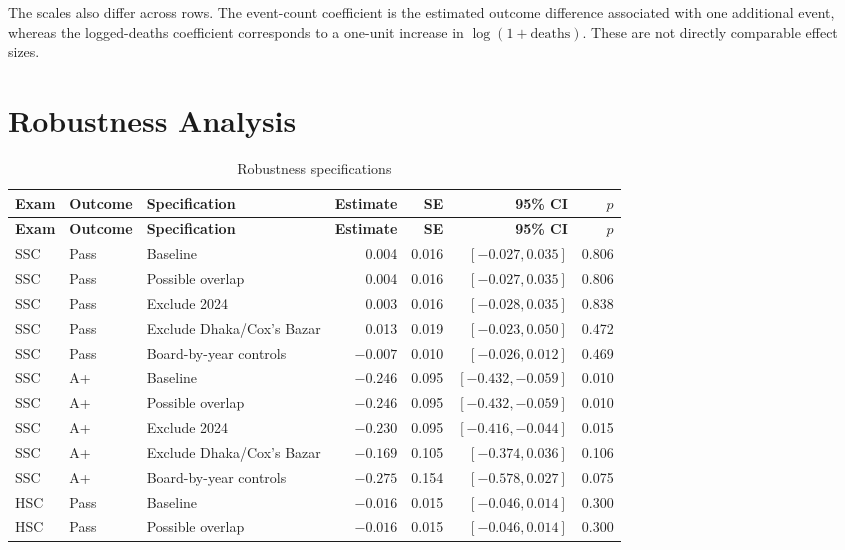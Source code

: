 \documentclass[11pt]{article}
\begin{document}
The scales also differ across rows. The event-count coefficient is the estimated outcome difference associated with one additional event, whereas the logged-deaths coefficient corresponds to a one-unit increase in $\log(1+\text{deaths})$. These are not directly comparable effect sizes.

\section{Robustness Analysis}

\begin{landscape}
{\small
\setlength{\tabcolsep}{5pt}
\begin{longtable}{lllrrrr}
\caption{Robustness specifications}\label{tab:robustness}\\
\toprule
\textbf{Exam} & \textbf{Outcome} & \textbf{Specification} & \textbf{Estimate} & \textbf{SE} & \textbf{95\% CI} & \textbf{$p$} \\
\midrule
\endfirsthead
\toprule
\textbf{Exam} & \textbf{Outcome} & \textbf{Specification} & \textbf{Estimate} & \textbf{SE} & \textbf{95\% CI} & \textbf{$p$} \\
\midrule
\endhead
SSC & Pass & Baseline & 0.004 & 0.016 & $[-0.027,0.035]$ & 0.806 \\
SSC & Pass & Possible overlap & 0.004 & 0.016 & $[-0.027,0.035]$ & 0.806 \\
SSC & Pass & Exclude 2024 & 0.003 & 0.016 & $[-0.028,0.035]$ & 0.838 \\
SSC & Pass & Exclude Dhaka/Cox's Bazar & 0.013 & 0.019 & $[-0.023,0.050]$ & 0.472 \\
SSC & Pass & Board-by-year controls & $-0.007$ & 0.010 & $[-0.026,0.012]$ & 0.469 \\
SSC & A+ & Baseline & $-0.246$ & 0.095 & $[-0.432,-0.059]$ & 0.010 \\
SSC & A+ & Possible overlap & $-0.246$ & 0.095 & $[-0.432,-0.059]$ & 0.010 \\
SSC & A+ & Exclude 2024 & $-0.230$ & 0.095 & $[-0.416,-0.044]$ & 0.015 \\
SSC & A+ & Exclude Dhaka/Cox's Bazar & $-0.169$ & 0.105 & $[-0.374,0.036]$ & 0.106 \\
SSC & A+ & Board-by-year controls & $-0.275$ & 0.154 & $[-0.578,0.027]$ & 0.075 \\
HSC & Pass & Baseline & $-0.016$ & 0.015 & $[-0.046,0.014]$ & 0.300 \\
HSC & Pass & Possible overlap & $-0.016$ & 0.015 & $[-0.046,0.014]$ & 0.300 \\

\end{longtable}}
\end{landscape}
\end{document}
